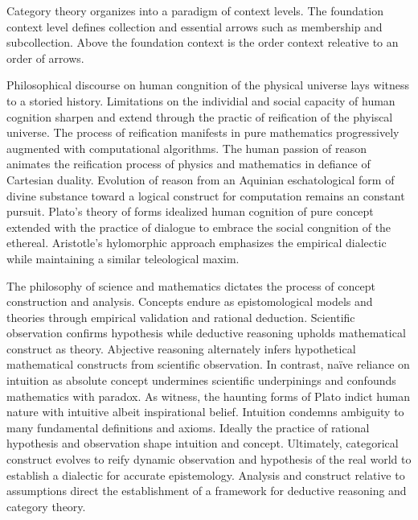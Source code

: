 \documentclass[aps,twocolumn,secnumarabic,nobalancelastpage,amsmath,amssymb,
amsthm,nofootinbib,parskip=full]{revtex4}
\numberwithin{equation}{section}
\begin{document}
Category theory organizes into a paradigm of context levels.
The foundation context level 
defines collection and essential arrows such as membership and subcollection.
Above the foundation context is the order context releative to an order of
arrows.

Philosophical discourse on human congnition of the physical universe
lays witness to a storied history.
Limitations on the individial and social capacity of human cognition
sharpen and extend through the practic of reification of the
phyiscal universe.
The process of reification manifests
in pure mathematics progressively augmented with computational algorithms.
The human passion of reason animates the reification process of
physics and mathematics in defiance of Cartesian duality.
Evolution of reason from an Aquinian eschatological form of divine substance
toward a logical construct for computation remains an constant pursuit.
Plato's theory of forms idealized human cognition of pure concept
extended with the practice of dialogue to embrace the
social congnition of the ethereal.
Aristotle's hylomorphic approach emphasizes the empirical dialectic
while maintaining a similar teleological maxim.

The philosophy of science and mathematics dictates the process of
concept construction and analysis.
Concepts endure as epistomological models and theories through
empirical validation and rational deduction.
Scientific observation confirms hypothesis while
deductive reasoning upholds mathematical construct as theory.
Abjective reasoning alternately infers hypothetical mathematical constructs
from scientific observation.
In contrast, na\"{i}ve reliance on intuition as absolute concept undermines
scientific underpinings and confounds mathematics with paradox.
As witness, the haunting forms of Plato
indict human nature with intuitive albeit inspirational belief.
Intuition condemns ambiguity to many fundamental definitions and axioms.
Ideally the practice of rational hypothesis and observation
shape intuition and concept.
Ultimately, categorical construct evolves to reify dynamic observation
and hypothesis of the real world to establish a
dialectic for accurate epistemology.
Analysis and construct relative to assumptions direct the establishment of a
framework for deductive reasoning and category theory.
\end{document}
